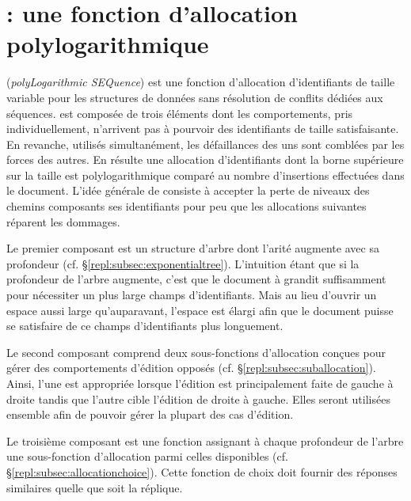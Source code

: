 
\section{\LSEQ : une fonction d'allocation polylogarithmique}
\label{repl:sec:proposal}

\LSEQ (\emph{polyLogarithmic SEQuence}) est une fonction d'allocation
d'identifiants de taille variable pour les structures de données sans résolution
de conflits dédiées aux séquences. \LSEQ est composée de trois éléments dont les
comportements, pris individuellement, n'arrivent pas à pourvoir des identifiants
de taille satisfaisante. En revanche, utilisés simultanément, les défaillances
des uns sont comblées par les forces des autres. En résulte une allocation
d'identifiants dont la borne supérieure sur la taille est polylogarithmique
comparé au nombre d'insertions effectuées dans le document. 
L'idée générale de \LSEQ consiste à accepter la perte de niveaux des chemins
composants ses identifiants pour peu que les allocations suivantes réparent les
dommages.

Le premier composant est un structure d'arbre dont l'arité augmente avec sa
profondeur (cf. §\ref{repl:subsec:exponentialtree}). L'intuition étant que si la
profondeur de l'arbre augmente, c'est que le document à grandit suffisamment
pour nécessiter un plus large champs d'identifiants. Mais au lieu d'ouvrir un
espace aussi large qu'auparavant, l'espace est élargi afin que le document
puisse se satisfaire de ce champs d'identifiants plus longuement.

Le second composant comprend deux sous-fonctions d'allocation conçues pour gérer
des comportements d'édition opposés (cf. §\ref{repl:subsec:suballocation}). Ainsi,
l'une est appropriée lorsque l'édition est principalement faite de gauche à
droite tandis que l'autre cible l'édition de droite à gauche. Elles seront
utilisées ensemble afin de pouvoir gérer la plupart des cas d'édition.

Le troisième composant est une fonction assignant à chaque profondeur de l'arbre
une sous-fonction d'allocation parmi celles disponibles
(cf. §\ref{repl:subsec:allocationchoice}). Cette fonction de choix doit fournir des
réponses similaires quelle que soit la réplique.

